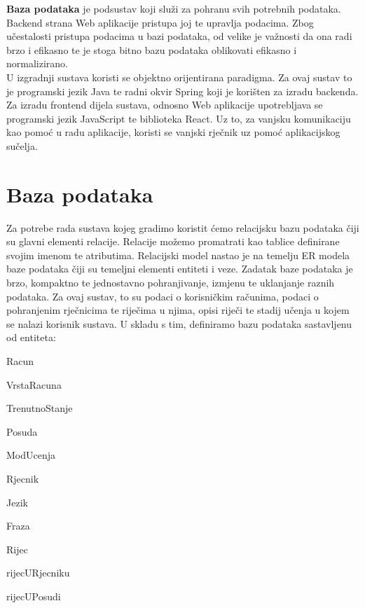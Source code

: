		
		\textbf{Baza podataka} je podsustav koji služi za pohranu svih potrebnih podataka. Backend strana Web aplikacije pristupa joj te upravlja podacima. Zbog učestalosti pristupa podacima u bazi podataka, od velike je važnosti da ona radi brzo i efikasno te je stoga bitno bazu podataka oblikovati efikasno i normalizirano.\\
		
		
		U izgradnji sustava koristi se objektno orijentirana paradigma. Za ovaj sustav to je programski jezik Java te radni okvir Spring koji je korišten za izradu backenda. Za izradu frontend dijela sustava, odnosno Web aplikacije upotrebljava se programski jezik JavaScript te biblioteka React. Uz to, za vanjsku komunikaciju kao pomoć u radu aplikacije, koristi se vanjski rječnik uz pomoć aplikacijskog sučelja.\\

				
		\section{Baza podataka}
			
			
		
Za potrebe rada sustava kojeg gradimo koristit ćemo relacijsku bazu podataka čiji su glavni elementi relacije. Relacije možemo promatrati kao tablice definirane svojim imenom te atributima. Relacijski model nastao je na temelju ER modela baze podataka čiji su temeljni elementi entiteti i veze. Zadatak baze podataka je brzo, kompaktno te jednostavno pohranjivanje, izmjenu te uklanjanje raznih podataka. Za ovaj sustav, to su podaci o korisničkim računima, podaci o pohranjenim rječnicima te riječima u njima, opisi riječi te stadij učenja u kojem se nalazi korisnik sustava. U skladu s tim, definiramo bazu podataka sastavljenu od entiteta:
			
			\begin{packed_item}
				
				\item Racun
				\item VrstaRacuna
				\item TrenutnoStanje
				\item Posuda
				\item ModUcenja
				\item Rjecnik
				\item Jezik
				\item Fraza
				\item Rijec
				\item rijecURjecniku
				\item rijecUPosudi
				
			\end{packed_item}
		

